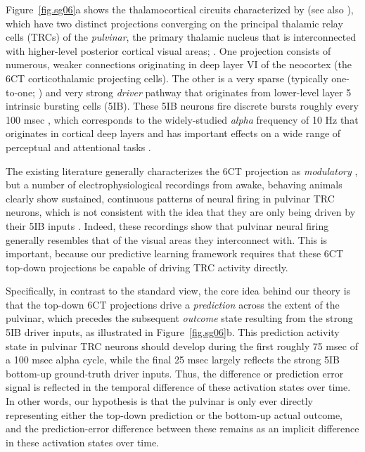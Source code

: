 \documentclass[11pt,twoside]{article}
\newif\myifpdf
\begin{document}
Figure~\ref{fig.sg06}a shows the thalamocortical circuits characterized by  (see also ), which have two distinct projections converging on the principal thalamic relay cells (TRCs) of the \emph{pulvinar}, the primary thalamic nucleus that is interconnected with higher-level posterior cortical visual areas; \cite{Shipp03}.  One projection consists of numerous, weaker connections originating in deep layer VI of the neocortex (the 6CT corticothalamic projecting cells).  The other is a very sparse (typically one-to-one; \cite{Rockland98a,Rockland96}) and very strong \emph{driver} pathway that originates from lower-level layer 5 intrinsic bursting cells (5IB).  These 5IB neurons fire discrete bursts roughly every 100 msec \cite{LarkumZhuSakmann99,FranceschettiGuatteoPanzicaEtAl95,LorinczKekesiJuhaszEtAl09,SaalmannPinskWangEtAl12}, which corresponds to the widely-studied \emph{alpha} frequency of 10 Hz that originates in cortical deep layers and has important effects on a wide range of perceptual and attentional tasks \cite{BuffaloFriesLandmanEtAl11,VanRullenKoch03,JensenBonnefondVanRullen12,FiebelkornKastner19}.

The existing literature generally characterizes the 6CT projection as \emph{modulatory} \cite{ShermanGuillery13,UsreySherman18}, but a number of electrophysiological recordings from awake, behaving animals clearly show sustained, continuous patterns of neural firing in pulvinar TRC neurons, which is not consistent with the idea that they are only being driven by their 5IB inputs \cite{Bender82,PetersenRobinsonKeys85,BenderYouakim01,Robinson93,SaalmannPinskWangEtAl12,KomuraNikkuniHirashimaEtAl13}.  Indeed, these recordings show that pulvinar neural firing generally resembles that of the visual areas they interconnect with.  This is important, because our predictive learning framework requires that these 6CT top-down projections be capable of driving TRC activity directly.

Specifically, in contrast to the standard view, the core idea behind our theory is that the top-down 6CT projections drive a \emph{prediction} across the extent of the pulvinar, which precedes the subsequent \emph{outcome} state resulting from the strong 5IB driver inputs, as illustrated in Figure~\ref{fig.sg06}b.  This prediction activity state in pulvinar TRC neurons should develop during the first roughly 75 msec of a 100 msec alpha cycle, while the final 25 msec largely reflects the strong 5IB bottom-up ground-truth driver inputs.  Thus, the difference or prediction error signal is reflected in the temporal difference of these activation states over time.  In other words, our hypothesis is that the pulvinar is only ever directly representing either the top-down prediction or the bottom-up actual outcome, and the prediction-error difference between these remains as an implicit difference in these activation states over time.
\end{document}
